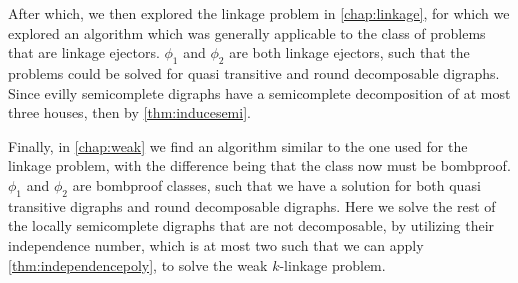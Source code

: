\documentclass[11pt,oneside,a4paper]{report}
\begin{document}
	After which, we then explored the linkage problem in \autoref{chap:linkage}, for which we explored an algorithm which was generally applicable to the class of problems that are linkage ejectors.
	$\phi_1$ and $\phi_2$ are both linkage ejectors, such that the problems could be solved for quasi transitive and round decomposable digraphs.
	Since evilly semicomplete digraphs have a semicomplete decomposition of at most three houses, then by \autoref{thm:inducesemi}.

	Finally, in \autoref{chap:weak} we find an algorithm similar to the one used for the linkage problem, with the difference being that the class now must be bombproof.
	$\phi_1$ and $\phi_2$ are bombproof classes, such that we have a solution for both quasi transitive digraphs and round decomposable digraphs.
	Here we solve the rest of the locally semicomplete digraphs that are not decomposable, by utilizing their independence number, which is at most two such that we can apply \autoref{thm:independencepoly}, to solve the weak $k$-linkage problem.
\end{document}
